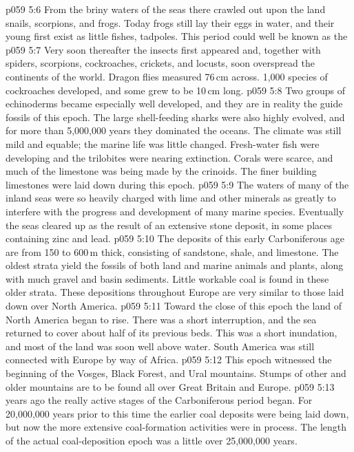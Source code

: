 \vs p059 5:6 From the briny waters of the seas there crawled out upon the land snails, scorpions, and frogs. Today frogs still lay their eggs in water, and their young first exist as little fishes, tadpoles. This period could well be known as the 
\vs p059 5:7 Very soon thereafter the insects first appeared and, together with spiders, scorpions, cockroaches, crickets, and locusts, soon overspread the continents of the world. Dragon flies measured 76\,cm across. 1,000 species of cockroaches developed, and some grew to be 10\,cm long.
\vs p059 5:8 Two groups of echinoderms became especially well developed, and they are in reality the guide fossils of this epoch. The large shell\hyp{}feeding sharks were also highly evolved, and for more than 5,000,000 years they dominated the oceans. The climate was still mild and equable; the marine life was little changed. Fresh\hyp{}water fish were developing and the trilobites were nearing extinction. Corals were scarce, and much of the limestone was being made by the crinoids. The finer building limestones were laid down during this epoch.
\vs p059 5:9 The waters of many of the inland seas were so heavily charged with lime and other minerals as greatly to interfere with the progress and development of many marine species. Eventually the seas cleared up as the result of an extensive stone deposit, in some places containing zinc and lead.
\vs p059 5:10 The deposits of this early Carboniferous age are from 150 to 600\,m thick, consisting of sandstone, shale, and limestone. The oldest strata yield the fossils of both land and marine animals and plants, along with much gravel and basin sediments. Little workable coal is found in these older strata. These depositions throughout Europe are very similar to those laid down over North America.
\vs p059 5:11 Toward the close of this epoch the land of North America began to rise. There was a short interruption, and the sea returned to cover about half of its previous beds. This was a short inundation, and most of the land was soon well above water. South America was still connected with Europe by way of Africa.
\vs p059 5:12 This epoch witnessed the beginning of the Vosges, Black Forest, and Ural mountains. Stumps of other and older mountains are to be found all over Great Britain and Europe.
\vs p059 5:13 \pc {} years ago the really active stages of the Carboniferous period began. For 20,000,000 years prior to this time the earlier coal deposits were being laid down, but now the more extensive coal\hyp{}formation activities were in process. The length of the actual coal\hyp{}deposition epoch was a little over 25,000,000 years.

